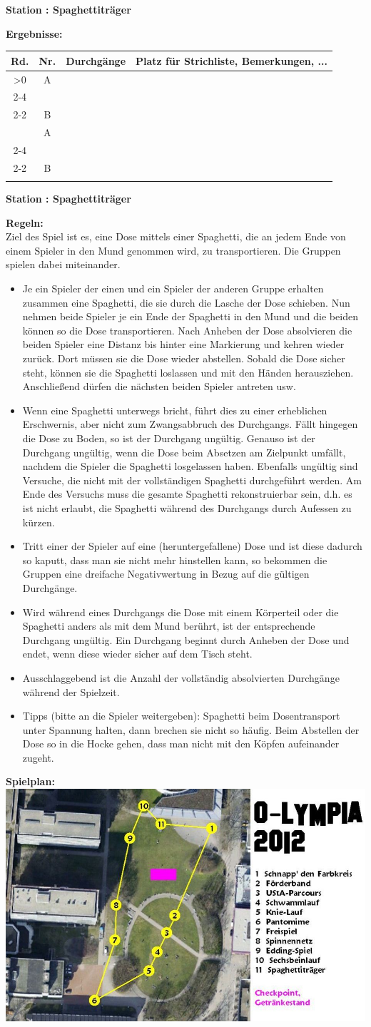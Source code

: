 \documentclass{scrartcl}
\newcommand{\replicate}[2]{\ifnum#1>0 #2
	\expandafter\replicate\expandafter{\number\numexpr#1-1}{#2}\fi}
\newcommand{\modulo}[2]{#1-((#1+#2)/#2-1)*#2}
\newcounter{station}\setcounter{station}{1}
\newcounter{ctrA}
\newcounter{ctrB}
\newcounter{currentRow}
\newcounter{noOfStations}\setcounter{noOfStations}{11}
\newenvironment{stationsheet}[3]
{\begin{center} \textbf{\huge Station \arabic{station}: #1}\\[2em]\end{center}
\textbf{\Large Ergebnisse:}\\[1em]
\setcounter{ctrA}{\value{station}}
\setcounter{ctrB}{\value{station}}
\setcounter{currentRow}{1}
\begin{tabular}{|c|c|p{3cm}|p{11cm}|}
\hline
\textbf{Rd.} & \textbf{Nr.} & \textbf{#2} & \textbf{Platz für Strichliste, Bemerkungen, ...}\\ \hline
\replicate{\value{noOfStations}}
{
\multirow{2}{*}{\arabic{currentRow}} & A\arabic{ctrA} & &
\ifthenelse{#3=0}{\\ \cline{2-4}}{\\ \cline{2-2}}
 & B\arabic{ctrB} & & \stepcounter{currentRow}
\setcounter{ctrA}{1+\modulo{\value{ctrA}-2}{\value{noOfStations}}}
\setcounter{ctrB}{1+\modulo{\value{ctrB}}{\value{noOfStations}}}
\\ \hline
}
\end{tabular}
\clearpage
\begin{center}\textbf{\huge Station \arabic{station}: #1}\end{center}
\textbf{\Large Regeln:}\\[1em]
}
{
\textbf{\Large Spielplan:}\\[1em]
\includegraphics[scale=0.57]{spielplan_11.png}
\addtocounter{station}{1}
\clearpage
}
\begin{document}
\begin{stationsheet}{Spaghettiträger}{Durchgänge}{1}
Ziel des Spiel ist es, eine Dose mittels einer Spaghetti, die an jedem Ende von einem Spieler in den Mund genommen wird, zu transportieren. Die Gruppen spielen dabei miteinander.
\begin{itemize}
\item Je ein Spieler der einen und ein Spieler der anderen Gruppe erhalten zusammen eine Spaghetti, die sie durch die Lasche der Dose schieben. Nun nehmen beide Spieler je ein Ende der Spaghetti in den Mund und die beiden können so die Dose transportieren. Nach Anheben der Dose absolvieren die beiden Spieler eine Distanz bis hinter eine Markierung und kehren wieder zurück. Dort müssen sie die Dose wieder abstellen. Sobald die Dose sicher steht, können sie die Spaghetti loslassen und mit den Händen herausziehen. Anschließend dürfen die nächsten beiden Spieler antreten usw.
\item Wenn eine Spaghetti unterwegs bricht, führt dies zu einer erheblichen Erschwernis, aber nicht zum Zwangsabbruch des Durchgangs. Fällt hingegen die Dose zu Boden, so ist der Durchgang ungültig. Genauso ist der Durchgang ungültig, wenn die Dose beim Absetzen am Zielpunkt umfällt, nachdem die Spieler die Spaghetti losgelassen haben. Ebenfalls ungültig sind Versuche, die nicht mit der vollständigen Spaghetti durchgeführt werden. Am Ende des Versuchs muss die gesamte Spaghetti rekonstruierbar sein, d.h. es ist nicht erlaubt, die Spaghetti während des Durchgangs durch Aufessen zu kürzen.
\item Tritt einer der Spieler auf eine (heruntergefallene) Dose und ist diese dadurch so kaputt, dass man sie nicht mehr hinstellen kann, so bekommen die Gruppen eine dreifache Negativwertung in Bezug auf die gültigen Durchgänge.
\item Wird während eines Durchgangs die Dose mit einem Körperteil oder die Spaghetti anders als mit dem Mund berührt, ist der entsprechende Durchgang ungültig. Ein Durchgang beginnt durch Anheben der Dose und endet, wenn diese wieder sicher auf dem Tisch steht.
\item Ausschlaggebend ist die Anzahl der vollständig absolvierten Durchgänge während der Spielzeit.
\item Tipps (bitte an die Spieler weitergeben): Spaghetti beim Dosentransport unter Spannung halten, dann brechen sie nicht so häufig. Beim Abstellen der Dose so in die Hocke gehen, dass man nicht mit den Köpfen aufeinander zugeht.
\end{itemize}
\end{stationsheet}
\end{document}
